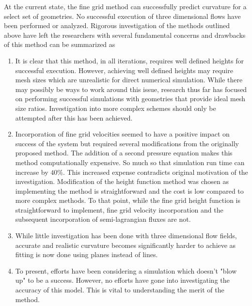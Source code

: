 At the current state, the fine grid method can successfully predict curvature for a select set of geometries. No successful execution of three dimensional flows have been performed or analyzed. Rigorous investigation of the methods outlined above have left the researchers with several fundamental concerns and drawbacks of this method can be summarized as
\begin{enumerate}
	\item It is clear that this method, in all iterations, requires well defined heights for successful execution. However, achieving well defined heights may require mesh sizes which are unrealistic for direct numerical simulation. While there may possibly be ways to work around this issue, research thus far has focused on performing successful simulations with geometries that provide ideal mesh size ratios. Investigation into more complex schemes should only be attempted after this has been achieved.
	\item Incorporation of fine grid velocities seemed to have a positive impact on success of the system but required several modifications from the originally proposed method. The addition of a second pressure equation makes this method computationally expensive. So much so that simulation run time can increase by $40\%$. This increased expense contradicts original motivation of the investigation. Modification of the height function method was chosen as implementing the method is straightforward and the cost is low compared to more complex methods. To that point, while the fine grid height function is straightforward to implement, fine grid velocity incorporation and the subsequent incorporation of semi-lagrangian fluxes are not. 
	\item While little investigation has been done with three dimensional flow fields, accurate and realistic curvature becomes significantly harder to achieve as fitting is now done using planes instead of lines.
	\item To present, efforts have been considering a simulation which doesn't "blow up" to be a success. However, no efforts have gone into investigating the accuracy of this model. This is vital to understanding the merit of the method. 
\end{enumerate} 

